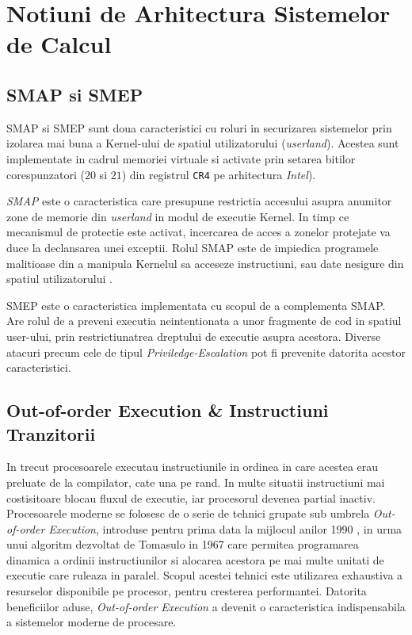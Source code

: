 \section{Notiuni de Arhitectura Sistemelor de Calcul}

\subsection{SMAP si SMEP}

SMAP si SMEP sunt doua caracteristici cu roluri in securizarea sistemelor prin
izolarea mai buna a Kernel-ului de spatiul utilizatorului (\emph{userland}).
Acestea sunt implementate in cadrul memoriei virtuale si activate prin setarea
bitilor corespunzatori ($20$ si $21$) din registrul \texttt{CR4} pe arhitectura
\emph{Intel}).

\emph{SMAP} este o caracteristica care presupune restrictia accesului asupra
anumitor zone de memorie din \emph{userland} in modul de executie Kernel. In
timp ce mecanismul de protectie este activat, incercarea de acces a zonelor
protejate va duce la declansarea unei exceptii. Rolul SMAP este de impiedica
programele malitioase din a manipula Kernelul sa acceseze instructiuni, sau
date nesigure din spatiul utilizatorului \cite{smap}.

SMEP este o caracteristica implementata cu scopul de a complementa SMAP. Are
rolul de a preveni executia neintentionata a unor fragmente de cod in spatiul 
user-ului, prin restrictiunatrea dreptului de executie asupra acestora. Diverse
atacuri precum cele de tipul \emph{Priviledge-Escalation} pot fi prevenite 
datorita acestor caracteristici.

\subsection{Out-of-order Execution \& Instructiuni Tranzitorii}


In trecut procesoarele executau instructiunile in ordinea in care acestea erau
preluate de la compilator, cate una pe rand. In multe situatii instructiuni mai
costisitoare blocau fluxul de executie, iar procesorul devenea partial inactiv.
Procesoarele moderne se folosesc de o serie de tehnici grupate sub umbrela
\emph{Out-of-order Execution}, introduse pentru prima data la mijlocul anilor
1990 \cite{what_is_speculative_execution}, in urma unui algoritm dezvoltat de 
Tomasulo in 1967 \cite{tomasulo1967} care permitea programarea dinamica
a ordinii instructiunilor si alocarea acestora pe mai multe unitati de executie
care ruleaza in paralel. Scopul acestei tehnici este utilizarea exhaustiva a
resurselor disponibile pe procesor, pentru cresterea performantei. Datorita
beneficiilor aduse, \emph{Out-of-order Execution} a devenit o caracteristica
indispensabila a sistemelor moderne de procesare.

